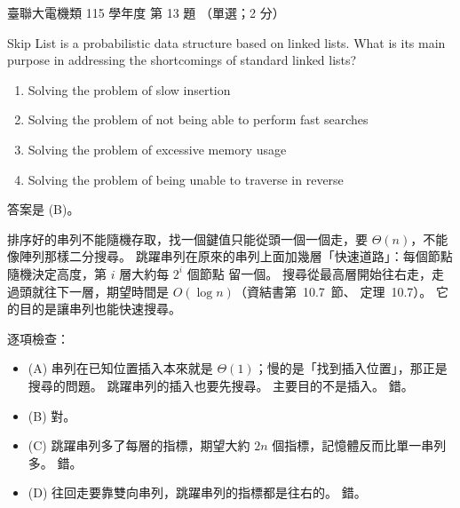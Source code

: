 \begin{pastexam}[label={px:ust-115-ee-ds-13}]{臺聯大電機類 115 學年度 第 13 題}
（單選；2 分）

Skip List is a probabilistic data structure based on linked lists. What is its main purpose in
addressing the shortcomings of standard linked lists?
\begin{enumerate}[label=(\Alph*)]
\item Solving the problem of slow insertion
\item Solving the problem of not being able to perform fast searches
\item Solving the problem of excessive memory usage
\item Solving the problem of being unable to traverse in reverse
\end{enumerate}
\end{pastexam}

\begin{pastsoln}
答案是 (B)。

排序好的串列不能隨機存取，找一個鍵值只能從頭一個一個走，要 $\Theta(n)$，不能像陣列那樣二分搜尋。
跳躍串列在原來的串列上面加幾層「快速道路」：每個節點隨機決定高度，第 $i$ 層大約每 $2^i$ 個節點
留一個。 搜尋從最高層開始往右走，走過頭就往下一層，期望時間是 $O(\log n)$（資結書第~10.7~節、
定理~10.7）。 它的目的是讓串列也能快速搜尋。

逐項檢查：
\begin{itemize}
\item (A) 串列在已知位置插入本來就是 $\Theta(1)$；慢的是「找到插入位置」，那正是搜尋的問題。
跳躍串列的插入也要先搜尋。 主要目的不是插入。 錯。
\item (B) 對。
\item (C) 跳躍串列多了每層的指標，期望大約 $2n$ 個指標，記憶體反而比單一串列多。 錯。
\item (D) 往回走要靠雙向串列，跳躍串列的指標都是往右的。 錯。
\end{itemize}
\end{pastsoln}
